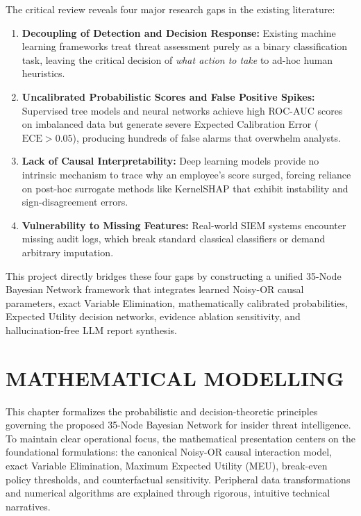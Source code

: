 \documentclass[12pt,a4paper]{report}
\begin{document}
The critical review reveals four major research gaps in the existing literature:
\begin{enumerate}
    \item \textbf{Decoupling of Detection and Decision Response:} Existing machine learning frameworks treat threat assessment purely as a binary classification task, leaving the critical decision of \textit{what action to take} to ad-hoc human heuristics.
    \item \textbf{Uncalibrated Probabilistic Scores and False Positive Spikes:} Supervised tree models and neural networks achieve high ROC-AUC scores on imbalanced data but generate severe Expected Calibration Error ($\text{ECE} > 0.05$), producing hundreds of false alarms that overwhelm analysts.
    \item \textbf{Lack of Causal Interpretability:} Deep learning models provide no intrinsic mechanism to trace why an employee's score surged, forcing reliance on post-hoc surrogate methods like KernelSHAP that exhibit instability and sign-disagreement errors.
    \item \textbf{Vulnerability to Missing Features:} Real-world SIEM systems encounter missing audit logs, which break standard classical classifiers or demand arbitrary imputation.
\end{enumerate}

This project directly bridges these four gaps by constructing a unified 35-Node Bayesian Network framework that integrates learned Noisy-OR causal parameters, exact Variable Elimination, mathematically calibrated probabilities, Expected Utility decision networks, evidence ablation sensitivity, and hallucination-free LLM report synthesis.


\chapter{MATHEMATICAL MODELLING}

This chapter formalizes the probabilistic and decision-theoretic principles governing the proposed 35-Node Bayesian Network for insider threat intelligence. To maintain clear operational focus, the mathematical presentation centers on the foundational formulations: the canonical Noisy-OR causal interaction model, exact Variable Elimination, Maximum Expected Utility (MEU), break-even policy thresholds, and counterfactual sensitivity. Peripheral data transformations and numerical algorithms are explained through rigorous, intuitive technical narratives.
\end{document}
